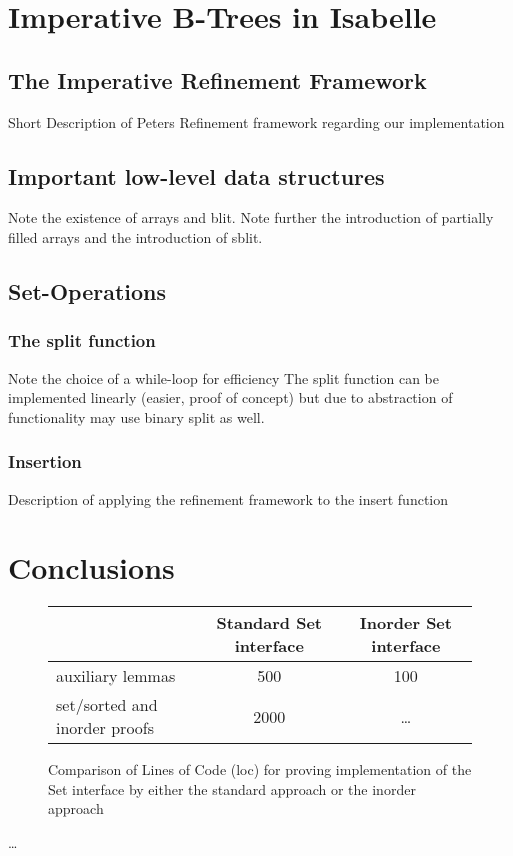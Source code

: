 \chapter{Imperative B-Trees in Isabelle}

\section{The Imperative Refinement Framework}

Short Description of Peters Refinement framework regarding our implementation

\section{Important low-level data structures}

Note the existence of arrays and blit.
Note further the introduction of partially filled arrays
and the introduction of sblit.

\section{Set-Operations}

\subsection{The split function}

Note the choice of a while-loop for efficiency
The split function can be implemented linearly (easier, proof of concept)
but due to abstraction of functionality may use binary split as well.

\subsection{Insertion}

Description of applying the refinement framework to the insert function

\chapter{Conclusions}

\begin{figure}
    \begin{tabular}{l|c|c}
        \                & Standard Set interface & Inorder Set interface \\
        \hline
        auxiliary lemmas & 500                    & 100                   \\
        set/sorted and inorder proofs & 2000      & \dots                 \\
    \end{tabular}
    \caption{Comparison of Lines of Code (loc) for proving implementation
    of the Set interface by either the standard approach or the inorder approach}
    \label{fig:proof-standard-inorder}
\end{figure}

\dots